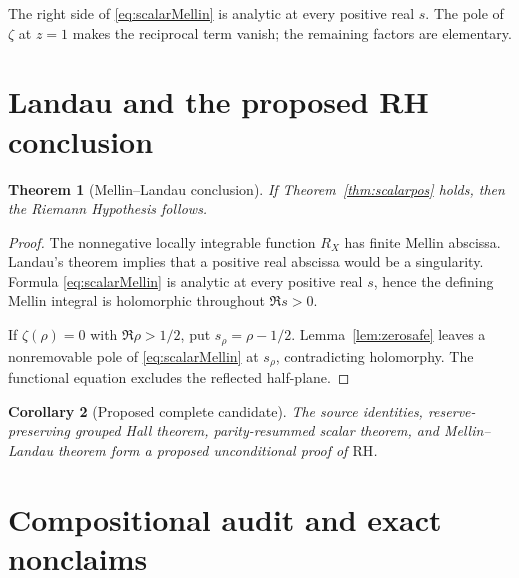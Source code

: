 \documentclass[11pt]{article}
\newtheorem{theorem}{Theorem}[section]
\newtheorem{corollary}[theorem]{Corollary}
\newcommand{\RH}{\ensuremath{\mathrm{RH}}}
\newcommand{\1}{\mathbf 1}
\begin{document}
The right side of \eqref{eq:scalarMellin} is analytic at every positive real $s$.  The pole of $\zeta$ at $z=1$ makes the reciprocal term vanish; the remaining factors are elementary.

\section{Landau and the proposed RH conclusion}

\begin{theorem}[Mellin--Landau conclusion]\label{thm:landau}
If Theorem~\ref{thm:scalarpos} holds, then the Riemann Hypothesis follows.
\end{theorem}
\begin{proof}
The nonnegative locally integrable function $R_X$ has finite Mellin abscissa.  Landau's theorem implies that a positive real abscissa would be a singularity.  Formula \eqref{eq:scalarMellin} is analytic at every positive real $s$, hence the defining Mellin integral is holomorphic throughout $\Re s>0$.

If $\zeta(\rho)=0$ with $\Re\rho>1/2$, put $s_\rho=\rho-1/2$.  Lemma~\ref{lem:zerosafe} leaves a nonremovable pole of \eqref{eq:scalarMellin} at $s_\rho$, contradicting holomorphy.  The functional equation excludes the reflected half-plane.
\end{proof}

\begin{corollary}[Proposed complete candidate]
The source identities, reserve-preserving grouped Hall theorem, parity-resummed scalar theorem, and Mellin--Landau theorem form a proposed unconditional proof of \RH.
\end{corollary}

\section{Compositional audit and exact nonclaims}
\end{document}
